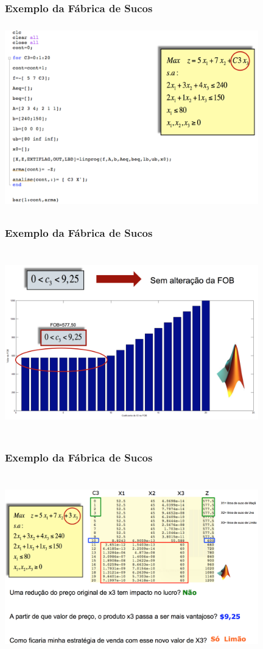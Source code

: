 \documentclass{beamer}
\begin{document}
\begin{frame}
	\frametitle{Exemplo da Fábrica de Sucos}
	\includegraphics[width=11cm,height=8cm]{Sensib_2.png}
\end{frame}

\begin{frame}
	\frametitle{Exemplo da Fábrica de Sucos}
	\includegraphics[width=11cm,height=8cm]{Sensib_3.png}
\end{frame}
	
\begin{frame}
	\frametitle{Exemplo da Fábrica de Sucos}
	\includegraphics[width=11cm,height=8cm]{Sensib_4.png}
\end{frame}
\end{document}
